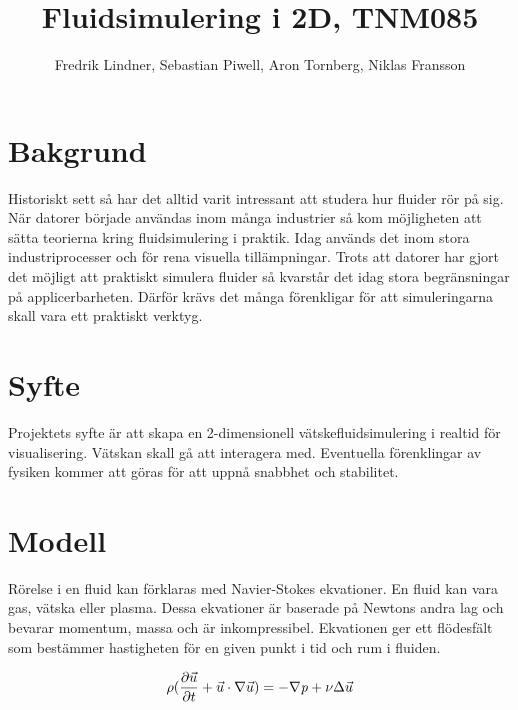 \documentclass[a4paper,12pt,oneside,final]{extarticle}
\author{Fredrik Lindner, Sebastian Piwell, Aron Tornberg, Niklas Fransson}
\title{Fluidsimulering i 2D, TNM085}
\begin{document}
\maketitle


\clearpage
\tableofcontents
\clearpage

\section{Bakgrund}
Historiskt sett så har det alltid varit intressant att studera hur fluider rör på sig.
När datorer började användas inom många industrier så kom möjligheten att sätta teorierna kring fluidsimulering i praktik.
Idag används det inom stora industriprocesser och för rena visuella tillämpningar.
Trots att datorer har gjort det möjligt att praktiskt simulera fluider så kvarstår det idag stora begränsningar på applicerbarheten.
Därför krävs det många förenkligar för att simuleringarna skall vara ett praktiskt verktyg.

\section{Syfte}
Projektets syfte är att skapa en 2-dimensionell vätskefluidsimulering i realtid för visualisering.
Vätskan skall gå att interagera med.
Eventuella förenklingar av fysiken kommer att göras för att uppnå snabbhet och stabilitet.

\clearpage

\section{Modell}
Rörelse i en fluid kan förklaras med Navier-Stokes ekvationer.
En fluid kan vara gas, vätska eller plasma.
Dessa ekvationer är baserade på Newtons andra lag och bevarar momentum, massa och är inkompressibel.
Ekvationen ger ett flödesfält som bestämmer hastigheten för en given punkt i tid och rum i fluiden.



\begin{equation} \label{eq:navier-stokes-1}
\rho(\frac{\partial \vec{u}}{\partial t} + \vec{u} \cdot \nabla \vec{u}) =  -\nabla {\it p} + \nu \Delta \vec{u}
\end{equation}
\end{document}
